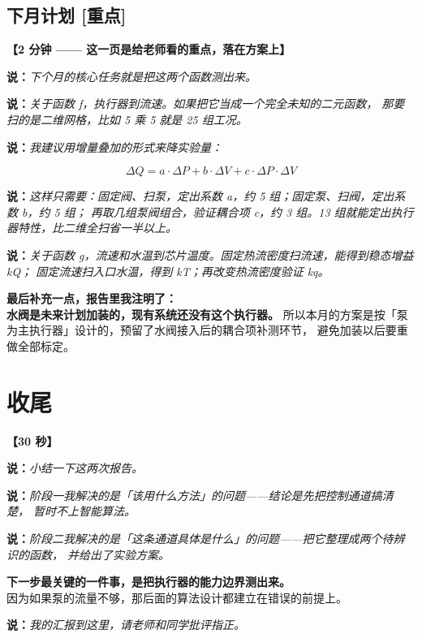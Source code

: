\documentclass[11pt,a4paper]{ctexart}
\newcommand{\shuo}[1]{\par{\color{cBlue}\bfseries 说：}{\itshape #1}\par}
\newcommand{\dongzuo}[1]{\par{\color{cWarnLine}\bfseries 【#1】}\par}
\begin{document}
\subsection{下月计划 [重点]}

\dongzuo{2 分钟 —— 这一页是给老师看的重点，落在方案上}

\shuo{下个月的核心任务就是把这两个函数测出来。}

\shuo{关于函数 f，执行器到流速。如果把它当成一个完全未知的二元函数，
那要扫的是二维网格，比如 5 乘 5 就是 25 组工况。}

\shuo{我建议用增量叠加的形式来降实验量：}

\[
\Delta Q = a \cdot \Delta P + b \cdot \Delta V + c \cdot \Delta P \cdot \Delta V
\]

\shuo{这样只需要：固定阀、扫泵，定出系数 a，约 5 组；固定泵、扫阀，定出系数 b，约 5 组；
再取几组泵阀组合，验证耦合项 c，约 3 组。13 组就能定出执行器特性，比二维全扫省一半以上。}

\shuo{关于函数 g，流速和水温到芯片温度。固定热流密度扫流速，能得到稳态增益 kQ；
固定流速扫入口水温，得到 kT；再改变热流密度验证 kq。}

\begin{tishi}
\textbf{最后补充一点，报告里我注明了：}\\
\textbf{水阀是未来计划加装的，现有系统还没有这个执行器。}
所以本月的方案是按「泵为主执行器」设计的，预留了水阀接入后的耦合项补测环节，
避免加装以后要重做全部标定。
\end{tishi}

\section{收尾}

\dongzuo{30 秒}

\shuo{小结一下这两次报告。}

\shuo{阶段一我解决的是「该用什么方法」的问题——结论是先把控制通道搞清楚，
暂时不上智能算法。}

\shuo{阶段二我解决的是「这条通道具体是什么」的问题——把它整理成两个待辨识的函数，
并给出了实验方案。}

\begin{yaodian}
\textbf{下一步最关键的一件事，是把执行器的能力边界测出来。}\\
因为如果泵的流量不够，那后面的算法设计都建立在错误的前提上。
\end{yaodian}

\shuo{我的汇报到这里，请老师和同学批评指正。}

\newpage
\appendix
\renewcommand{\thesection}{附录 \Alph{section}}
\end{document}
